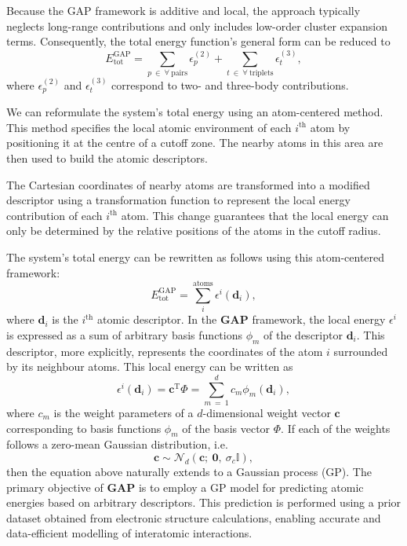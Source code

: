 Because the GAP framework is additive and local, the approach typically neglects long-range contributions and only includes low-order cluster expansion terms. 
Consequently, the total energy function's general form can be reduced to
\begin{equation}
    \label{equ:2.47}
     E^{\text{GAP}}_{\text{tot}} = \sum_{p\:\in\:\forall\:\text{pairs}}\epsilon_{p}^{(2)} + \sum_{t\:\in\:\forall\:\text{triplets}}\epsilon_{t}^{(3)},
\end{equation}
where $\epsilon_{p}^{(2)}$ and $\epsilon_{t}^{(3)}$ correspond to two- and three-body contributions.

We can reformulate the system's total energy using an atom-centered method. This method specifies the local atomic environment of each $i^{\text{th}}$ atom by positioning it at the centre of a cutoff zone. The nearby atoms in this area are then used to build the atomic descriptors.

The Cartesian coordinates of nearby atoms are transformed into a modified descriptor using a transformation function to represent the local energy contribution of each $i^{\text{th}}$ atom. This change guarantees that the local energy can only be determined by the relative positions of the atoms in the cutoff radius.  

The system's total energy can be rewritten as follows using this atom-centered framework:
\begin{equation}
    \label{equ:2.48}
     E^{\text{GAP}}_{\text{tot}} = \sum^{\text{atoms}}_{i}\epsilon^{i}(\textbf{d}_{i}),
\end{equation}
where $\textbf{d}_{i}$ is the $i^{\text{th}}$ atomic descriptor.
In the \textbf{GAP} framework, the local energy $\epsilon^{i}$ is expressed as a sum of arbitrary basis functions $\phi_{m}$ of the descriptor $\textbf{d}_{i}$.
This descriptor, more explicitly, represents the coordinates of the atom $i$ surrounded by its neighbour atoms. 
This local energy can be written as
\begin{equation}
    \label{equ:2.49}
     \epsilon^{i}(\textbf{d}_{i})= \textbf{c}^{\text{T}}\Phi = \sum_{m\:=\:1}^{d}c_{m}\phi_{m}(\textbf{d}_{i}),
\end{equation}
where $c_{m}$ is the weight parameters of a $d$-dimensional weight vector $\textbf{c}$ corresponding to basis functions $\phi_{m}$ of the basis vector $\Phi$. 
If each of the weights follows a zero-mean Gaussian distribution, i.e. 
\[\textbf{c}\sim\mathcal{N}_{d}(\textbf{c};\:\textbf{0},\:\sigma_{c}\mathbb{I}),\]
then the equation above naturally extends to a Gaussian process (GP).
The primary objective of \textbf{GAP} is to employ a GP model for predicting atomic energies based on arbitrary descriptors. 
This prediction is performed using a prior dataset obtained from electronic structure calculations, enabling accurate and data-efficient modelling of interatomic interactions.


